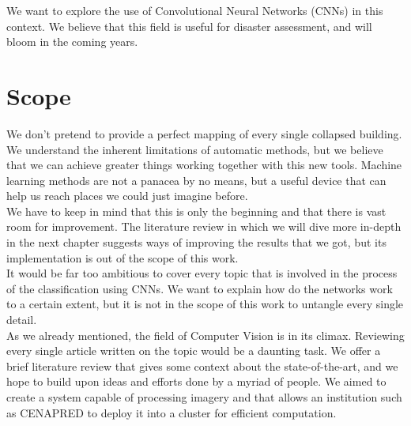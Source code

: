 We want to explore the use of Convolutional Neural Networks (CNNs) in this context. We believe that this field is useful for disaster assessment, and will bloom in the coming years.\\

\section{Scope}

We don't pretend to provide a perfect mapping of every single collapsed building. We understand the inherent limitations of automatic methods, but we believe that we can achieve greater things working together with this new tools. Machine learning methods are not a panacea by no means, but a useful device that can help us reach places we could just imagine before.\\

We have to keep in mind that this is only the beginning and that there is vast room for improvement. The literature review in which we will dive more in-depth in the next chapter suggests ways of improving the results that we got, but its implementation is out of the scope of this work.\\

It would be far too ambitious to cover every topic that is involved in the process of the classification using CNNs. We want to explain how do the networks work to a certain extent, but it is not in the scope of this work to untangle every single detail.\\

As we already mentioned, the field of Computer Vision is in its climax. Reviewing every single article written on the topic would be a daunting task. We offer a brief literature review that gives some context about the state-of-the-art, and we hope to build upon ideas and efforts done by a myriad of people. We aimed to create a system capable of processing imagery and that allows an institution such as CENAPRED to deploy it into a cluster for efficient computation.\\